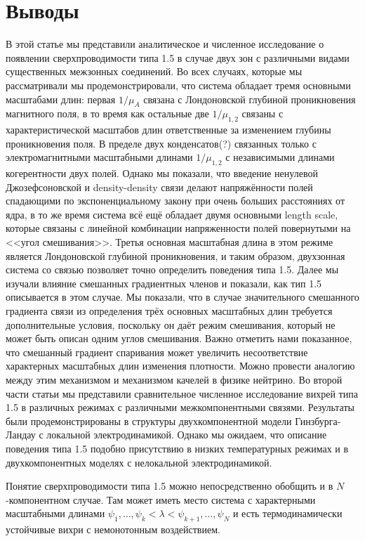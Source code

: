 \chapter{Выводы}

В этой статье мы представили аналитическое и численное исследование о 
появлении сверхпроводимости типа 1.5 в случае двух зон с различными видами 
существенных межзонных соединений. Во всех случаях, которые мы рассматривали 
мы продемонстрировали, что система обладает тремя основными масштабами длин: 
первая \( 1/\mu_A \) связана с Лондоновской глубиной 
проникновения магнитного поля, в то время как остальные две \( 1/\mu_{1,2} \) 
связаны с характеристической масштабов длин ответственные за изменением 
глубины проникновения поля. В пределе двух конденсатов(?) связанных только с 
электромагнитными масштабными длинами \( 1/\mu_{1,2} \) с независимыми  
длинами когерентности двух полей. Однако мы показали, что введение ненулевой 
Джозефсоновской и density-density связи делают напряжённости полей спадающими 
по экспоненциальному закону при очень больших расстояниях от ядра, в то же 
время система всё ещё обладает двумя основными length scale, которые связаны 
с линейной комбинации напряженности полей повернутыми на <<угол смешивания>>. 
Третья основная масштабная длина в этом режиме является Лондоновской глубиной 
проникновения, и таким образом, двухзонная система со связью позволяет точно 
определить поведения типа 1.5. Далее мы изучали влияние смешанных градиентных 
членов и показали, как тип 1.5 описывается в этом случае. Мы показали, что в 
случае значительного смешанного градиента связи из определения трёх основных 
масштабных длин требуется дополнительные условия, поскольку он даёт режим 
смешивания, который не может быть описан одним углов смешивания. Важно 
отметить нами показанное, что смешанный градиент спаривания может увеличить 
несоответствие характерных масштабных длин изменения плотности. Можно провести 
аналогию между этим механизмом и механизмом качелей в физике нейтрино. Во 
второй части статьи мы представили сравнительное численное исследование 
вихрей типа 1.5 в различных режимах с различными межкомпонентными связями. 
Результаты были продемонстрированы в структуры двухкомпонентной модели 
Гинзбурга-Ландау с локальной электродинамикой. Однако мы ожидаем, что 
описание поведения типа 1.5 подобно присутствию в низких температурных 
режимах и в двухкомпонентных моделях с нелокальной электродинамикой.   

Понятие сверхпроводимости типа 1.5 можно непосредственно обобщить и в 
\( N \)-компонентном случае. Там может иметь место система с  
характерными масштабными длинами 
\( 
	\psi_1, \ldots, \psi_k < \lambda < \psi_{k+1}, \ldots, \psi_N
\) 
и есть термодинамически устойчивые вихри с немонотонным воздействием. 

